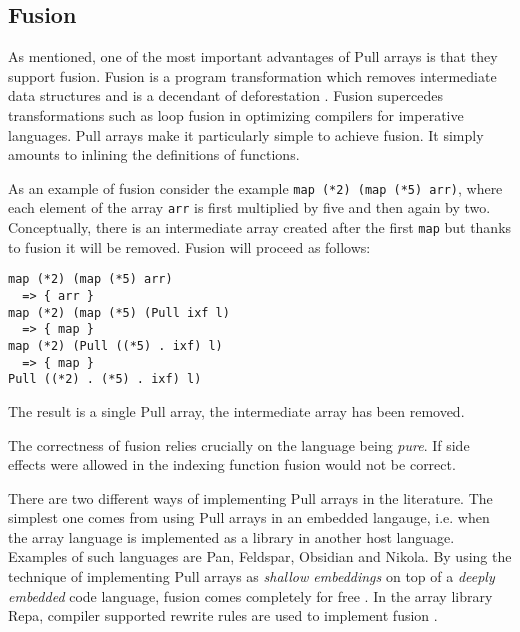 \documentclass{sigplanconf}
\begin{document}
\subsection{Fusion}

As mentioned, one of the most important advantages of Pull arrays is
that they support
fusion\cite{gill1993short,axelsson2010feldspar,keller2010regular}. Fusion
is a program transformation which removes intermediate data structures
and is a decendant of deforestation
\cite{wadler1990deforestation}. Fusion supercedes transformations such
as loop fusion in optimizing compilers for imperative languages.  Pull
arrays make it particularly simple to achieve fusion. It simply
amounts to inlining the definitions of functions.

As an example of fusion consider the example
\newline
\verb!map (*2) (map (*5) arr)!, where each element of the array
\verb!arr! is first multiplied by five and then again by
two. Conceptually, there is an intermediate array created after the
first \verb!map! but thanks to fusion it will be removed. Fusion will proceed
as follows:

\begin{verbatim}
map (*2) (map (*5) arr)
  => { arr }
map (*2) (map (*5) (Pull ixf l)
  => { map }
map (*2) (Pull ((*5) . ixf) l)
  => { map }
Pull ((*2) . (*5) . ixf) l)
\end{verbatim}

The result is a single Pull array, the intermediate array has been removed.

The correctness of fusion relies crucially on the language being
\emph{pure}. If side effects were allowed in the indexing function
fusion would not be correct.

There are two different ways of implementing Pull arrays in the
literature. The simplest one comes from using Pull arrays in an
embedded langauge, i.e. when the array language is implemented as a
library in another host language. Examples of such languages are
Pan\cite{elliott2003compiling}, Feldspar\cite{Axelsson:2010:Feldspar},
Obsidian\cite{Svensson:2011:Obsidian} and
Nikola\cite{Mainland:2010:Nikola}. By using the technique of
implementing Pull arrays as \emph{shallow embeddings} on top of a
\emph{deeply embedded} code language, fusion comes completely for free
\cite{svenningsson2013combining}.
In the array library Repa\cite{keller2010regular}, compiler supported
rewrite rules are used to implement fusion \cite{jones2001playing}.
\end{document}
